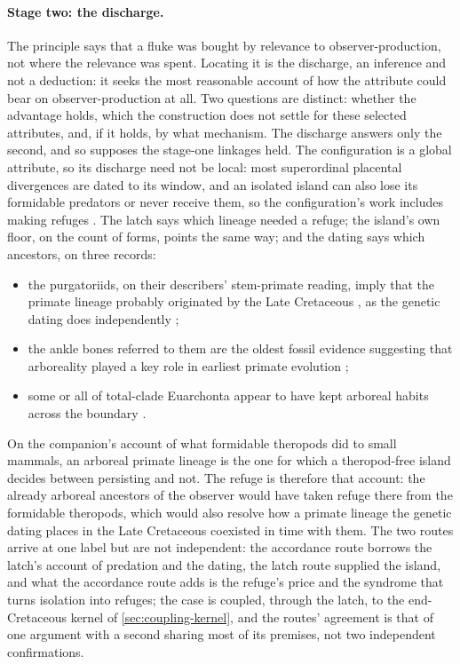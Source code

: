 \documentclass[11pt]{article}
\theoremstyle{definition}
\begin{document}
\paragraph{Stage two: the discharge.} The principle says that a fluke was bought by relevance to observer-production, not where the relevance was spent. Locating it is the discharge, an inference and not a deduction: it seeks the most reasonable account of how the attribute could bear on observer-production at all. Two questions are distinct: whether the advantage holds, which the construction does not settle for these selected attributes, and, if it holds, by what mechanism. The discharge answers only the second, and so supposes the stage-one linkages held. The configuration is a global attribute, so its discharge need not be local: most superordinal placental divergences are dated to its window, and an isolated island can also lose its formidable predators or never receive them, so the configuration's work includes making refuges \cite{Nexus}. The latch says which lineage needed a refuge; the island's own floor, on the count of forms, points the same way; and the dating says which ancestors, on three records:
\begin{itemize}
\item the purgatoriids, on their describers' stem-primate reading, imply that the primate lineage probably originated by the Late Cretaceous \cite{WilsonMantilla2021purgatoriids}, as the genetic dating does independently \cite{POZZI2014165};
\item the ankle bones referred to them are the oldest fossil evidence suggesting that arboreality played a key role in earliest primate evolution \cite{Chester2015tarsals};
\item some or all of total-clade Euarchonta appear to have kept arboreal habits across the boundary \cite{Hughes2021substrate}.
\end{itemize}
On the companion's account of what formidable theropods did to small mammals, an arboreal primate lineage is the one for which a theropod-free island decides between persisting and not. The refuge is therefore that account: the already arboreal ancestors of the observer would have taken refuge there from the formidable theropods, which would also resolve how a primate lineage the genetic dating places in the Late Cretaceous coexisted in time with them. The two routes arrive at one label but are not independent: the accordance route borrows the latch's account of predation and the dating, the latch route supplied the island, and what the accordance route adds is the refuge's price and the syndrome that turns isolation into refuges; the case is coupled, through the latch, to the end-Cretaceous kernel of \autoref{sec:coupling-kernel}, and the routes' agreement is that of one argument with a second sharing most of its premises, not two independent confirmations.
\end{document}

